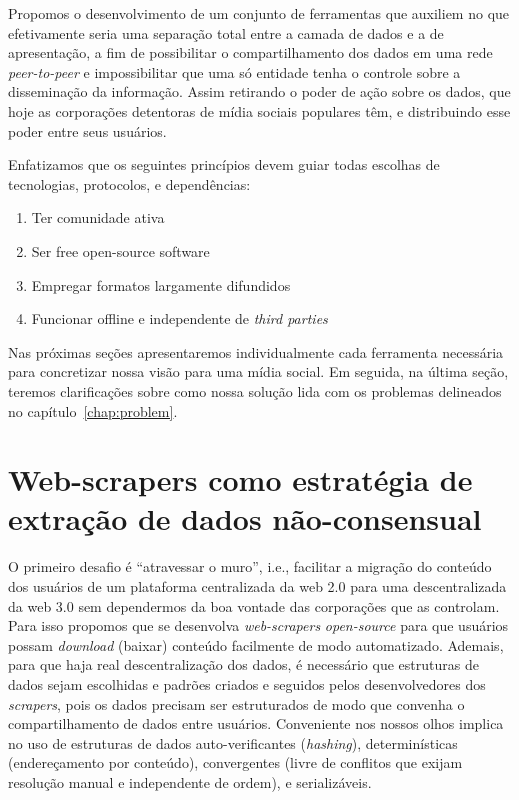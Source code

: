 Propomos o desenvolvimento de um conjunto de ferramentas que auxiliem no que efetivamente seria uma separação total entre a camada de dados e a de apresentação, a fim de possibilitar o compartilhamento dos dados em uma rede \textit{peer-to-peer} e impossibilitar que uma só entidade tenha o controle sobre a disseminação da informação.
Assim retirando o poder de ação sobre os dados, que hoje as corporações detentoras de mídia sociais populares têm, e distribuindo esse poder entre seus usuários.

Enfatizamos que os seguintes princípios devem guiar todas escolhas de tecnologias, protocolos, e dependências:

\begin{enumerate}
    \item Ter comunidade ativa
    \item Ser free open-source software
    \item Empregar formatos largamente difundidos
    \item Funcionar offline e independente de \textit{third parties}
\end{enumerate}

Nas próximas seções apresentaremos individualmente cada ferramenta necessária para concretizar nossa visão para uma mídia social.
Em seguida, na última seção, teremos clarificações sobre como nossa solução lida com os problemas delineados no capítulo~\ref{chap:problem}.

\section{Web-scrapers como estratégia de extração de dados não-consensual}

O primeiro desafio é ``atravessar o muro'', i.e., facilitar a migração do conteúdo dos usuários de um plataforma centralizada da web 2.0 para uma descentralizada da web 3.0 sem dependermos da boa vontade das corporações que as controlam.
Para isso propomos que se desenvolva \textit{web-scrapers} \textit{open-source} para que usuários possam \textit{download} (baixar) conteúdo facilmente de modo automatizado.
Ademais, para que haja real descentralização dos dados, é necessário que estruturas de dados sejam escolhidas e padrões criados e seguidos pelos desenvolvedores dos \textit{scrapers}, pois os dados precisam ser estruturados de modo que convenha o compartilhamento de dados entre usuários.
Conveniente nos nossos olhos implica no uso de estruturas de dados auto-verificantes (\textit{hashing}), determinísticas (endereçamento por conteúdo), convergentes (livre de conflitos que exijam resolução manual e independente de ordem), e serializáveis.

